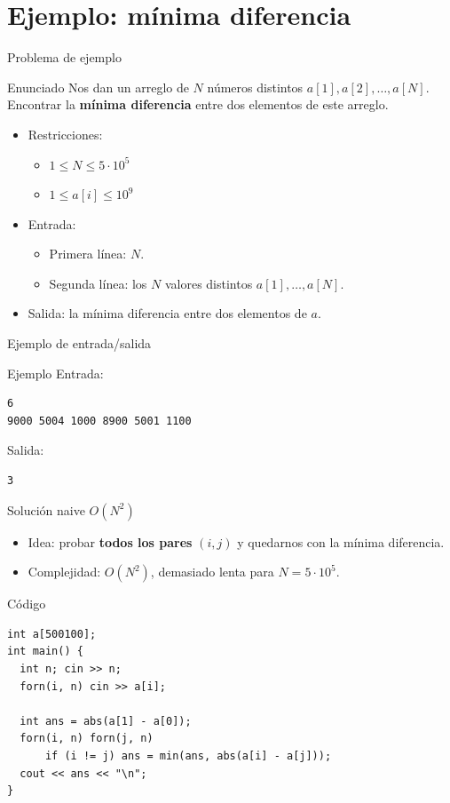 \documentclass[aspectratio=169]{beamer}
\begin{document}
\section{Ejemplo: mínima diferencia}

\begin{frame}{Problema de ejemplo}
  \begin{block}{Enunciado}
    Nos dan un arreglo de \(N\) números distintos \(a[1], a[2], \dots, a[N]\).\\
    Encontrar la \textbf{mínima diferencia} entre dos elementos de este arreglo.
  \end{block}
  \begin{itemize}
    \item Restricciones:
      \begin{itemize}
        \item \(1 \le N \le 5 \cdot 10^5\)
        \item \(1 \le a[i] \le 10^9\)
      \end{itemize}
    \item Entrada:
      \begin{itemize}
        \item Primera línea: \(N\).
        \item Segunda línea: los \(N\) valores distintos \(a[1], \dots, a[N]\).
      \end{itemize}
    \item Salida: la mínima diferencia entre dos elementos de \(a\).
  \end{itemize}
\end{frame}

\begin{frame}[fragile]{Ejemplo de entrada/salida}
  \begin{block}{Ejemplo}
  \small
  Entrada:
  \begin{verbatim}
6
9000 5004 1000 8900 5001 1100
  \end{verbatim}
  Salida:
  \begin{verbatim}
3
  \end{verbatim}
  \end{block}
\end{frame}

\begin{frame}[fragile]{Solución naive \(O(N^2)\)}
  \begin{itemize}
    \item Idea: probar \textbf{todos los pares} \((i, j)\) y quedarnos con la mínima diferencia.
    \item Complejidad: \(O(N^2)\), demasiado lenta para \(N = 5 \cdot 10^5\).
  \end{itemize}
  \begin{block}{Código}
  \begin{lstlisting}[style=customc]
int a[500100];
int main() {
  int n; cin >> n;
  forn(i, n) cin >> a[i];

  int ans = abs(a[1] - a[0]);
  forn(i, n) forn(j, n)
      if (i != j) ans = min(ans, abs(a[i] - a[j]));
  cout << ans << "\n";
}\end{lstlisting}
  \end{block}
\end{frame}
\end{document}
